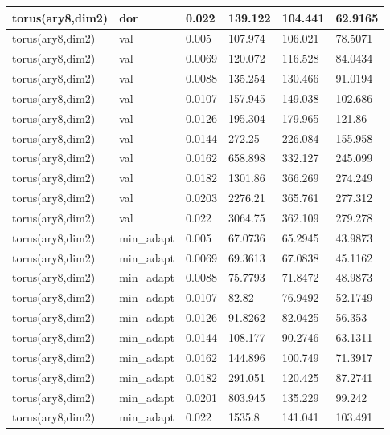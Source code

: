 \begin{longtable}[H]{llllll}
torus(ary8,dim2) & dor        & 0.022                          & 139.122 & 104.441 & 62.9165 \\ \hline
torus(ary8,dim2) & val        & 0.005                          & 107.974 & 106.021 & 78.5071 \\
torus(ary8,dim2) & val        & 0.0069                         & 120.072 & 116.528 & 84.0434 \\
torus(ary8,dim2) & val        & 0.0088                         & 135.254 & 130.466 & 91.0194 \\
torus(ary8,dim2) & val        & 0.0107                         & 157.945 & 149.038 & 102.686 \\
torus(ary8,dim2) & val        & 0.0126                         & 195.304 & 179.965 & 121.86  \\
torus(ary8,dim2) & val        & 0.0144                         & 272.25  & 226.084 & 155.958 \\
torus(ary8,dim2) & val        & 0.0162                         & 658.898 & 332.127 & 245.099 \\
torus(ary8,dim2) & val        & 0.0182                         & 1301.86 & 366.269 & 274.249 \\
torus(ary8,dim2) & val        & \cellcolor[HTML]{FFFF00}0.0203 & 2276.21 & 365.761 & 277.312 \\
torus(ary8,dim2) & val        & 0.022                          & 3064.75 & 362.109 & 279.278 \\ \hline
torus(ary8,dim2) & min\_adapt & 0.005                          & 67.0736 & 65.2945 & 43.9873 \\
torus(ary8,dim2) & min\_adapt & 0.0069                         & 69.3613 & 67.0838 & 45.1162 \\
torus(ary8,dim2) & min\_adapt & 0.0088                         & 75.7793 & 71.8472 & 48.9873 \\
torus(ary8,dim2) & min\_adapt & 0.0107                         & 82.82   & 76.9492 & 52.1749 \\
torus(ary8,dim2) & min\_adapt & 0.0126                         & 91.8262 & 82.0425 & 56.353  \\
torus(ary8,dim2) & min\_adapt & 0.0144                         & 108.177 & 90.2746 & 63.1311 \\
torus(ary8,dim2) & min\_adapt & 0.0162                         & 144.896 & 100.749 & 71.3917 \\
torus(ary8,dim2) & min\_adapt & 0.0182                         & 291.051 & 120.425 & 87.2741 \\
torus(ary8,dim2) & min\_adapt & 0.0201                         & 803.945 & 135.229 & 99.242  \\
torus(ary8,dim2) & min\_adapt & 0.022                          & 1535.8  & 141.041 & 103.491 \\ \hline
\end{longtable}



